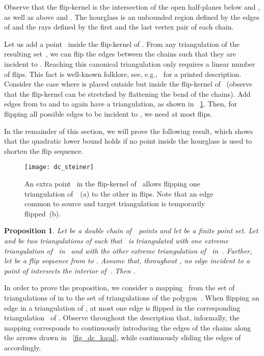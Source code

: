 \documentclass[11pt,a4paper]{article}
\newtheorem{proposition}[theorem]{Proposition}
\begin{document}
Observe that the flip-kernel is the intersection of the open half-planes below  and , as well as above  and .
The hourglass is an unbounded region defined by the edges of  and the rays defined by the first and the last vertex pair of each chain.

Let us add a point~ inside the flip-kernel of .
From any triangulation of the resulting set~, we can flip the edges between the chains such that they are incident to .
Reaching this canonical triangulation only requires a linear number of flips.
This fact is well-known folklore, see, e.g.,~\cite{problemas} for a printed description.
Consider the case where  is placed outside  but inside the flip-kernel of~ (observe that the flip-kernel can be stretched by flattening the bend of the chains).
Add edges from  to  and  to again have a triangulation, as shown in \figurename~\ref{fig_dc_steiner}.
Then, for flipping all possible edges to be incident to , we need at most  flips.

In the remainder of this section, we will prove the following result, which shows that the quadratic lower bound holds if no point inside the hourglass is used to shorten the flip sequence.

\begin{figure}
\centering
\texttt{[image: dc\_steiner]}
\caption{An extra point~ in the flip-kernel of~ allows flipping one triangulation of~~(a) to the other in  flips.
Note that an edge common to source and target triangulation is temporarily flipped~(b).}
\label{fig_dc_steiner}
\end{figure}



\begin{proposition}\label{prop_no_outer}
Let  be a double chain of~~points and let  be a finite point set.
Let  and  be two triangulations of  such that~ is triangulated with one extreme triangulation of~ in~ and with the other extreme triangulation of~ in~.
Further, let  be a flip sequence from  to .
Assume that, throughout , no edge incident to a point of  intersects the interior of~.
Then .
\end{proposition}

In order to prove the proposition, we consider a mapping~ from the set of triangulations of  in  to the set of triangulations of the polygon~.
When flipping an edge in a triangulation  of , at most one edge is flipped in the corresponding triangulation~ of .
Observe throughout the description that, informally, the mapping corresponds to continuously introducing the edges of the chains along the arrows drawn in \figurename~\ref{fig_dc_local}, while continuously sliding the edges of  accordingly.
\end{document}
